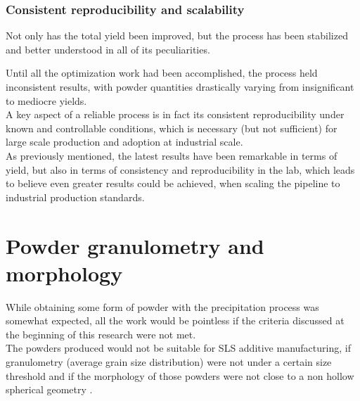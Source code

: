 \documentclass{article}
\begin{document}
%
%

        \subsubsection{Consistent reproducibility and scalability\label{consistent_reproducibility}}

        Not only has the total yield been improved, but the process has been stabilized and better understood in all of its 
        peculiarities. 

        Until all the optimization work had been accomplished, the process held inconsistent results, with powder quantities drastically 
        varying from insignificant to mediocre yields. \\ 

        A key aspect of a reliable process is in fact its consistent reproducibility under known and controllable conditions, 
        which is necessary (but not sufficient) for large scale production and adoption at industrial scale. \\ 

        As previously mentioned, the latest results have been remarkable in terms of yield, but also in terms of consistency and
        reproducibility in the lab, which leads to believe even greater results could be 
        achieved, when scaling the pipeline to industrial production standards. \\ 




    \clearpage
    \section{Powder granulometry and morphology\label{powder_granulometry_morphology}} 

    While obtaining some form of powder with the precipitation process was somewhat expected, all the work would be 
    pointless if the criteria discussed at the beginning of this research were not met. \\ 

    The powders produced would not be suitable for SLS additive manufacturing, if granulometry (average grain size distribution)
    were not under a certain size threshold and if the morphology of those powders were not close to a non hollow spherical geometry 
    \autocites{Padovano_SLS_Review}. \\
\end{document}
